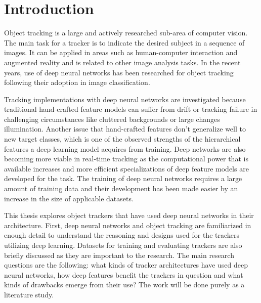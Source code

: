 \section{Introduction}
Object tracking is a large and actively researched sub-area of computer vision. The
main task for a tracker is to indicate the desired subject in a sequence of images.
It can be applied in areas such as human-computer interaction and augmented reality
and is related to other image analysis tasks. In the recent years, use of deep neural
networks has been researched for object tracking following their adoption in image
classification.

Tracking implementations with deep neural networks are investigated because traditional
hand-crafted feature models can suffer from drift or tracking failure in challenging
circumstances like cluttered backgrounds or large changes illumination. Another issue
that hand-crafted features don’t generalize well to new target classes, which is one
of the observed strengths of the hierarchical features a deep learning model acquires
from training. Deep networks are also becoming more viable in real-time tracking as
the computational power that is available increases and more efficient specializations
of deep feature models are developed for the task. The training of deep neural networks
requires a large amount of training data and their development has been made easier by
an increase in the size of applicable datasets.

This thesis explores object trackers that have used deep neural networks in their
architecture. First, deep neural networks and object tracking are familiarized in
enough detail to understand the reasoning and designs used for the trackers utilizing
deep learning. Datasets for training and evaluating trackers are also briefly discussed
as they are important to the research. The main research questions are the following:
what kinds of tracker architectures have used deep neural networks, how deep features
benefit the trackers in question and what kinds of drawbacks emerge from their use? The
work will be done purely as a literature study.
